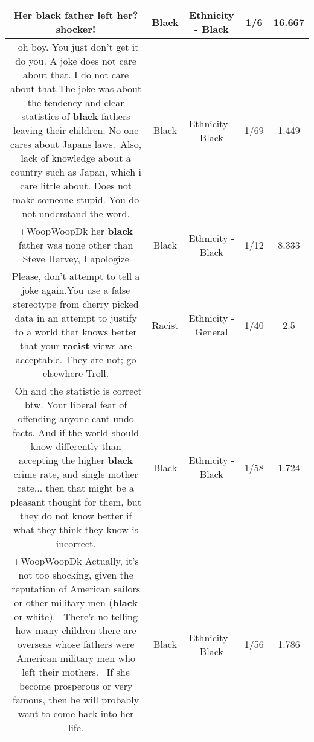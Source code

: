 \documentclass[11pt]{article}
\newlength\mylength
\begin{document}
\begin{center}
\begin{longtable}{|C{.65\mylength}|C{.30\mylength}|C{.12\mylength}|C{.12\mylength}|C{.12\mylength}|}
  \small Her \textbf{black} father left her? shocker!\normalsize   & Black & Ethnicity - Black & 1/6 & 16.667 \\  \hline
  \small {} oh boy. You just don't get it do you. A joke does not care about that. I do not care about that.The joke was about the tendency and clear statistics of \textbf{black} fathers leaving their children. No one cares about Japans laws. Also, lack of knowledge about a country such as Japan, which i care little about. Does not make someone stupid. You do not understand the word.\normalsize   & Black & Ethnicity - Black & 1/69 & 1.449 \\  \hline
  \small +WoopWoopDk  her \textbf{black} father was none other than Steve Harvey, I apologize\normalsize   & Black & Ethnicity - Black & 1/12 & 8.333 \\  \hline
  \small Please, don't attempt to tell a joke again.You use a false stereotype from cherry picked data in an attempt to justify to a world that knows better that your \textbf{racist} views are acceptable. They are not; go elsewhere Troll.\normalsize   & Racist & Ethnicity - General & 1/40 & 2.5 \\  \hline
  \small {} Oh and the statistic is correct btw. Your liberal fear of offending anyone cant undo facts. And if the world should know differently than accepting the higher \textbf{black} crime rate, and single mother rate... then that might be a pleasant thought for them, but they do not know better if what they think they know is incorrect.\normalsize   & Black & Ethnicity - Black & 1/58 & 1.724 \\  \hline
  \small +WoopWoopDk Actually, it's not too shocking, given the reputation of American sailors or other military men (\textbf{black} or white).  There's no telling how many children there are overseas whose fathers were American military men who left their mothers.  If she become prosperous or very famous, then he will probably want to come back into her life.\normalsize   & Black & Ethnicity - Black & 1/56 & 1.786 \\  \hline

\end{longtable}
\end{center}
\end{document}
